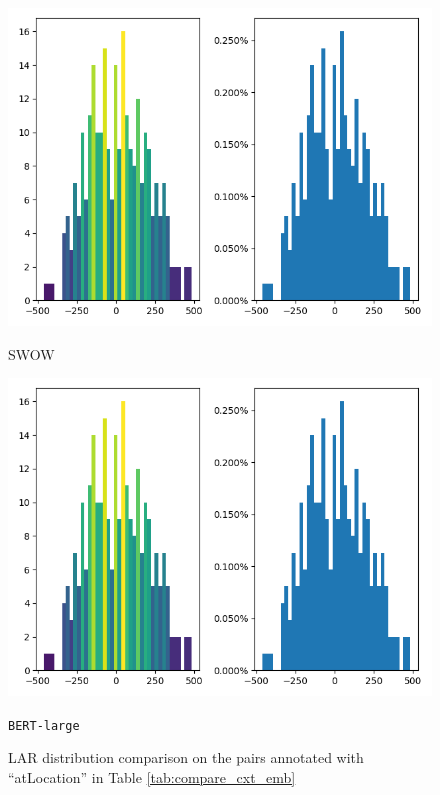 \documentclass[letterpaper]{article} %
\begin{document}
\begin{figure}[!]
\centering
\begin{minipage}[b]{0.45\textwidth}
    \includegraphics[width=\textwidth]{rel_atlocation_gtSWOW_bert_large.png}
    \caption*{SWOW}
  \end{minipage}
  \hfill
  \begin{minipage}[b]{0.45\textwidth}
    \includegraphics[width=\textwidth]{rel_atlocation_gtSWOW_bert_large.png}
    \caption*{\texttt{BERT-large}}
  \end{minipage}
\caption{LAR distribution comparison on the pairs annotated with ``atLocation'' in Table \ref{tab:compare_cxt_emb} }
\label{fig:compare_lar_atlocation}
\end{figure}
\end{document}
